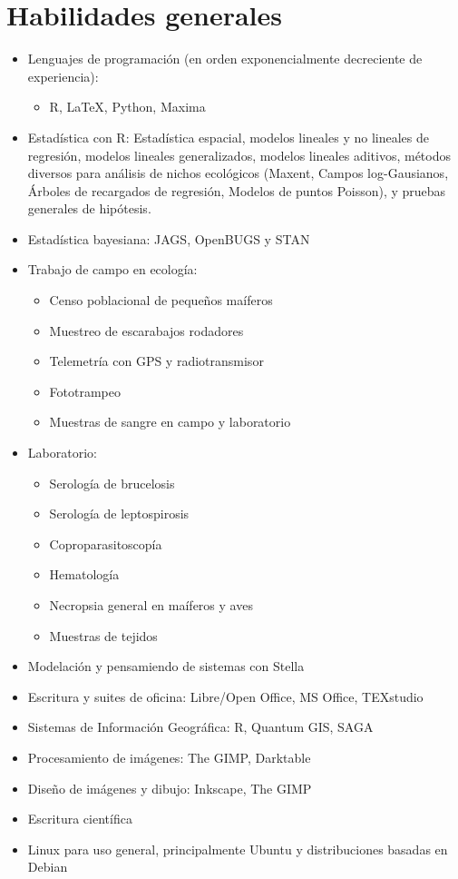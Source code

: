 \documentclass[11pt, letter]{article}
\begin{document}
\section*{Habilidades generales}
\begin{itemize}
	\item Lenguajes de programaci\'on (en orden exponencialmente decreciente de experiencia):
	\begin{itemize}
		\item R, \LaTeX, Python, Maxima
	\end{itemize}
	\item Estad\'istica con R: Estad\'istica espacial, modelos lineales y no lineales de regresi\'on, modelos lineales generalizados, modelos lineales aditivos, m\'etodos diversos para an\'alisis de nichos ecol\'ogicos (Maxent, Campos log-Gausianos, \'Arboles de recargados de regresi\'on, Modelos de puntos Poisson), y pruebas generales de hip\'otesis.
	\item Estad\'istica bayesiana: JAGS, OpenBUGS y STAN
	\item Trabajo de campo en ecolog\'ia:
	\begin{itemize}
		\item Censo poblacional de peque\~nos ma\'iferos
		\item Muestreo de escarabajos rodadores
		\item Telemetr\'ia con GPS y radiotransmisor
		\item Fototrampeo
		\item Muestras de sangre en campo y laboratorio
	\end{itemize}
	\item Laboratorio:
	\begin{itemize}
		\item Serolog\'ia de brucelosis
		\item Serolog\'ia de leptospirosis
		\item Coproparasitoscop\'ia
		\item Hematolog\'ia
		\item Necropsia general en ma\'iferos y aves
		\item Muestras de tejidos
	\end{itemize}
	\item Modelaci\'on y pensamiendo de sistemas con Stella
	\item Escritura y suites de oficina: Libre/Open Office, MS Office, TEXstudio
	\item Sistemas de Informaci\'on Geogr\'afica: R, Quantum GIS, SAGA
	\item Procesamiento de im\'agenes: The GIMP, Darktable
	\item Dise\~no de im\'agenes y dibujo: Inkscape, The GIMP
	\item Escritura cient\'ifica
	\item Linux para uso general, principalmente Ubuntu y distribuciones basadas en Debian
\end{itemize}
\end{document}
